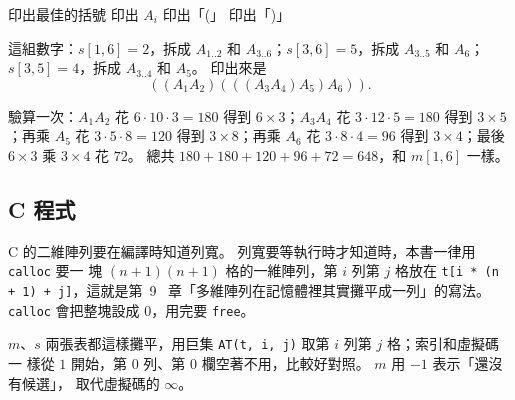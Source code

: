 \begin{pseudo}[label=alg:dp-mc-parens]{印出最佳的括號}
        \State 印出 $A_i$
    \Else
        \State 印出「(」
        \State {}
        \State {}
        \State 印出「)」
    \EndIf
\EndProcedure
\end{pseudo}

這組數字：$s[1, 6] = 2$，拆成 $A_{1..2}$ 和 $A_{3..6}$；$s[3, 6] = 5$，拆成 $A_{3..5}$ 和
$A_6$；$s[3, 5] = 4$，拆成 $A_{3..4}$ 和 $A_5$。 印出來是
\[
((A_1 A_2)(((A_3 A_4) A_5) A_6)) .
\]

驗算一次：$A_1 A_2$ 花 $6 \cdot 10 \cdot 3 = 180$ 得到 $6 \times 3$；$A_3 A_4$ 花
$3 \cdot 12 \cdot 5 = 180$ 得到 $3 \times 5$；再乘 $A_5$ 花 $3 \cdot 5 \cdot 8 = 120$ 得到
$3 \times 8$；再乘 $A_6$ 花 $3 \cdot 8 \cdot 4 = 96$ 得到 $3 \times 4$；最後 $6 \times 3$ 乘
$3 \times 4$ 花 $72$。 總共 $180 + 180 + 120 + 96 + 72 = 648$，和 $m[1, 6]$ 一樣。

\subsection{C 程式}

\begin{cbookrecap}[第~9~章 9.7 節、第~19~章 19.3 節]
C 的二維陣列要在編譯時知道列寬。 列寬要等執行時才知道時，本書一律用 \texttt{calloc} 要一
塊 $(n+1)(n+1)$ 格的一維陣列，第 $i$ 列第 $j$ 格放在 \texttt{t[i * (n + 1) + j]}，這就是第~9~
章「多維陣列在記憶體裡其實攤平成一列」的寫法。 \texttt{calloc} 會把整塊設成 $0$，用完要
\texttt{free}。
\end{cbookrecap}

$m$、$s$ 兩張表都這樣攤平，用巨集 \texttt{AT(t, i, j)} 取第 $i$ 列第 $j$ 格；索引和虛擬碼一
樣從 $1$ 開始，第 $0$ 列、第 $0$ 欄空著不用，比較好對照。 $m$ 用 $-1$ 表示「還沒有候選」，
取代虛擬碼的 $\infty$。


